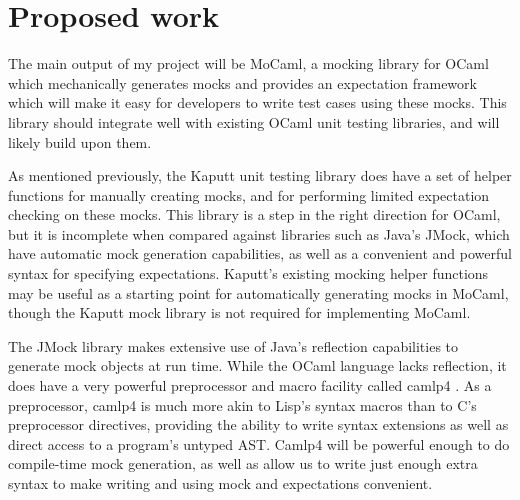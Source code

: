 \documentclass[proposal]{softeng}
\begin{document}
\section{Proposed work}


The main output of my project will be MoCaml, a mocking library for
OCaml which mechanically generates mocks and provides an expectation
framework which will make it easy for developers to write test cases
using these mocks. This library should integrate well with existing
OCaml unit testing libraries, and will likely build upon them.

As mentioned previously, the Kaputt unit testing library does have a
set of helper functions for manually creating mocks, and for
performing limited expectation checking on these mocks. This library
is a step in the right direction for OCaml, but it is incomplete when
compared against libraries such as Java's JMock, which have automatic
mock generation capabilities, as well as a convenient and powerful
syntax for specifying expectations. Kaputt's existing mocking helper
functions may be useful as a starting point for automatically
generating mocks in MoCaml, though the Kaputt mock library is not
required for implementing MoCaml.

The JMock library makes extensive use of Java's reflection
capabilities to generate mock objects at run time. While the OCaml
language lacks reflection, it does have a very powerful preprocessor
and macro facility called camlp4 \cite{www:reading_camlp4}. As a
preprocessor, camlp4 is much more akin to Lisp's syntax macros than to
C's preprocessor directives, providing the ability to write syntax
extensions as well as direct access to a program's untyped AST. Camlp4
will be powerful enough to do compile-time mock generation, as well as
allow us to write just enough extra syntax to make writing and using
mock and expectations convenient.
\end{document}
